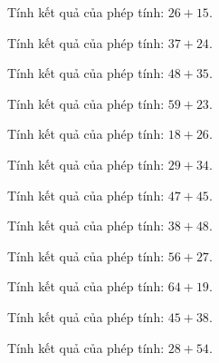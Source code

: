 \begin{ex}
Tính kết quả của phép tính: $26 + 15$.
\end{ex}

\begin{ex}
Tính kết quả của phép tính: $37 + 24$.
\end{ex}

\begin{ex}
Tính kết quả của phép tính: $48 + 35$.
\end{ex}

\begin{ex}
Tính kết quả của phép tính: $59 + 23$.
\end{ex}

\begin{ex}
Tính kết quả của phép tính: $18 + 26$.
\end{ex}

\begin{ex}
Tính kết quả của phép tính: $29 + 34$.
\end{ex}

\begin{ex}
Tính kết quả của phép tính: $47 + 45$.
\end{ex}

\begin{ex}
Tính kết quả của phép tính: $38 + 48$.
\end{ex}

\begin{ex}
Tính kết quả của phép tính: $56 + 27$.
\end{ex}

\begin{ex}
Tính kết quả của phép tính: $64 + 19$.
\end{ex}

\begin{ex}
Tính kết quả của phép tính: $45 + 38$.
\end{ex}

\begin{ex}
Tính kết quả của phép tính: $28 + 54$.
\end{ex}

